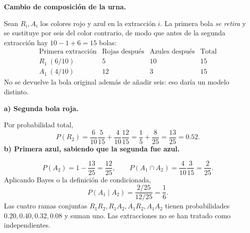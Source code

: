 \textbf{Cambio de composición de la urna.}\par\nopagebreak[4]
Sean $R_i,A_i$ los colores rojo y azul en la extracción $i$. La primera bola \emph{se retira} y se sustituye por seis del color contrario, de modo que antes de la segunda extracción hay $10-1+6=15$ bolas:
\[
\begin{array}{c|rr|r}
\text{Primera extracción}&\text{Rojas después}&\text{Azules después}&\text{Total}\\\hline
R_1\ (6/10)&5&10&15\\
A_1\ (4/10)&12&3&15
\end{array}
\]
No se devuelve la bola original además de añadir seis: eso daría un modelo distinto.

\textbf{a) Segunda bola roja.}\par\nopagebreak[4]
Por probabilidad total,
\[
\boxed{P(R_2)=\frac6{10}\frac5{15}+\frac4{10}\frac{12}{15}
=\frac15+\frac8{25}=\frac{13}{25}=0.52.}
\]
\textbf{b) Primera azul, sabiendo que la segunda fue azul.}\par\nopagebreak[4]
\[
P(A_2)=1-\frac{13}{25}=\frac{12}{25},\qquad
P(A_1\cap A_2)=\frac4{10}\frac3{15}=\frac2{25}.
\]
Aplicando Bayes o la definición de condicionada,
\[
\boxed{P(A_1\mid A_2)=\frac{2/25}{12/25}=\frac16.}
\]
Las cuatro ramas conjuntas $R_1R_2,R_1A_2,A_1R_2,A_1A_2$ tienen probabilidades $0.20,0.40,0.32,0.08$ y suman uno. Las extracciones no se han tratado como independientes.
